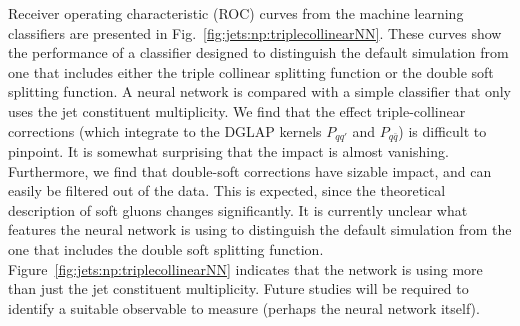 Receiver operating characteristic (ROC) curves from the machine learning classifiers are presented in Fig.~\ref{fig:jets:np:triplecollinearNN}.  These curves show the performance of a classifier designed to distinguish the default simulation from one that includes either the triple collinear splitting function or the double soft splitting function.  A neural network is compared with a simple classifier that only uses the jet constituent multiplicity.  We find that the effect triple-collinear corrections (which integrate to
the DGLAP kernels $P_{qq'}$ and $P_{q\bar q}$) is difficult to pinpoint. 
It is somewhat surprising that the impact is almost vanishing.  Furthermore, we find that double-soft corrections have sizable impact, and can
easily be filtered out of the data. This is expected, since the theoretical
description of soft gluons changes significantly.  It is currently unclear what features the neural network is using to distinguish the default simulation from the one that includes the double soft splitting function.  Figure~\ref{fig:jets:np:triplecollinearNN} indicates that the network is using more than just the jet constituent multiplicity.  Future studies will be required to identify a suitable observable to measure (perhaps the neural network itself).  

